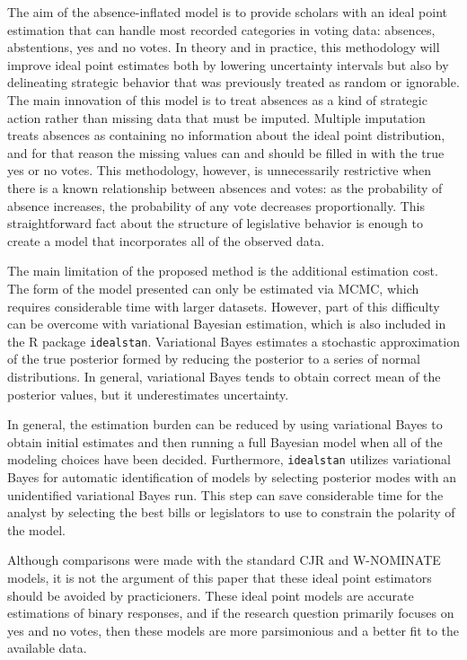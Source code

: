 	The aim of the absence-inflated model is to provide scholars with an ideal point estimation that can handle most recorded categories in voting data: absences, abstentions, yes and no votes. In theory and in practice, this methodology will improve ideal point estimates both by lowering uncertainty intervals but also by delineating strategic behavior that was previously treated as random or ignorable. The main innovation of this model is to treat absences as a kind of strategic action rather than missing data that must be imputed. Multiple imputation treats absences as containing no information about the ideal point distribution, and for that reason the missing values can and should be filled in with the true yes or no votes. This methodology, however, is unnecessarily restrictive when there is a known relationship between absences and votes: as the probability of absence increases, the probability of any vote decreases proportionally. This straightforward fact about the structure of legislative behavior is enough to create a model that incorporates all of the observed data. 
	
	The main limitation of the proposed method is the additional estimation cost. The form of the model presented can only be estimated via MCMC, which requires considerable time with larger datasets. However, part of this difficulty can be overcome with variational Bayesian estimation, which is also included in the R package \texttt{idealstan}. Variational Bayes estimates a stochastic approximation of the true posterior formed by reducing the posterior to a series of normal distributions. In general, variational Bayes tends to obtain correct mean of the posterior values, but it underestimates uncertainty.
	
	In general, the estimation burden can be reduced by using variational Bayes to obtain initial estimates and then running a full Bayesian model when all of the modeling choices have been decided. Furthermore, \texttt{idealstan} utilizes variational Bayes for automatic identification of models by selecting posterior modes with an unidentified variational Bayes run. This step can save considerable time for the analyst by selecting the best bills or legislators to use to constrain the polarity of the model. 
	
	Although comparisons were made with the standard CJR and W-NOMINATE models, it is not the argument of this paper that these ideal point estimators should be avoided by practicioners. These ideal point models are accurate estimations of binary responses, and if the research question primarily focuses on yes and no votes, then these models are more parsimonious and a better fit to the available data.
	

